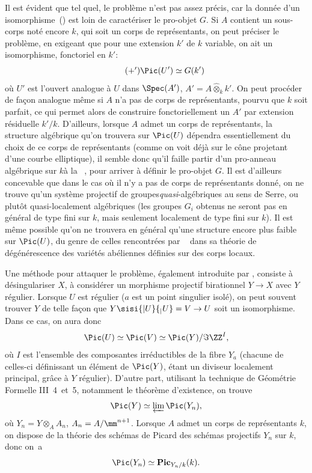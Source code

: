 Il est \'evident que tel quel, le probl\`eme n'est pas assez pr\'ecis, car la donn\'ee d'un isomorphisme~() est loin de caract\'eriser le pro-objet $G$. Si $A$ contient un sous-corps not\'e encore $k$, qui soit un corps de repr\'esentants, on peut pr\'eciser le probl\`eme, en exigeant que pour une extension $k'$ de $k$ variable, on ait un isomorphisme, fonctoriel en $k'$: \begin{equation*} \label{eq:XIII.5.+'} \tag{$+'$} {\Pic(U')\simeq G(k')} \end{equation*} o\`u $U'$ est l'ouvert analogue \`a $U$ dans $\Spec(A')$, $A'=A\hat{\otimes}_k k'$. On peut proc\'eder de fa\c con analogue m\^eme si $A$ n'a pas de corps de repr\'esentants, pourvu que $k$ soit parfait, ce qui permet alors de construire fonctoriellement un $A'$ \og par extension r\'esiduelle $k'/k$\fg. D'ailleurs, lorsque $A$ admet un corps de repr\'esentants, la structure alg\'ebrique qu'on trouvera sur $\Pic(U)$ d\'ependra essentiellement du choix de ce corps de repr\'esentants (comme on voit d\'ej\`a sur le c\^{o}ne projetant d'une courbe elliptique), il semble donc qu'il faille partir d'un \og pro-anneau alg\'ebrique sur $k$\fg \`a la ~\cite{XIII.3}, pour arriver \`a d\'efinir le pro-objet $G$. Il est d'ailleurs concevable que dans le cas o\`u il n'y a pas de corps de repr\'esentants donn\'e, on ne trouve qu'un syst\`eme projectif de groupes\pageoriginaled \emph{quasi}-alg\'ebriques au sens de Serre, ou plut\^{o}t quasi-localement alg\'ebriques (les groupes $G_i$ obtenus ne seront pas en g\'en\'eral de type fini sur $k$, mais seulement localement de type fini sur $k$). Il est m\^eme possible qu'on ne trouvera en g\'en\'eral qu'une structure encore plus faible sur $\Pic(U)$, du genre de celles rencontr\'ees par ~\cite{XIII.6} dans sa th\'eorie de d\'eg\'en\'erescence des vari\'et\'es ab\'eliennes d\'efinies sur des corps locaux.

Une m\'ethode pour attaquer le probl\`eme, \'egalement introduite par , consiste \`a d\'esingulariser $X$, \ie \`a consid\'erer un morphisme projectif birationnel $Y\to X$ avec $Y$ r\'egulier. Lorsque $U$ est r\'egulier (\ie $a$ est un point singulier isol\'e), on peut souvent trouver $Y$ de telle fa\c con que $Y\sisi{|U}{_|U}=V\to U$ soit un isomorphisme. Dans ce cas, on aura donc $$ \Pic(U)\simeq\Pic(V)\simeq\Pic(Y)/\Im \ZZ^I, $$ o\`u $I$ est l'ensemble des composantes irr\'eductibles de la fibre $Y_{a}$\sisi{, }{} (chacune de celles-ci d\'efinissant un \'el\'ement de $\Pic(Y)$, \'etant un diviseur localement principal, gr\^ace \`a $Y$ r\'egulier). D'autre part, utilisant la technique de G\'eom\'etrie Formelle \EGA III~4~et~5, notamment le th\'eor\`eme d'existence, on trouve $$ \Pic(Y)\simeq\varprojlim\Pic(Y_n), $$ o\`u $Y_n=Y\otimes_A A_n$, $A_n=A/\mm^{n+1}$. Lorsque $A$ admet un corps de repr\'esentants $k$, on dispose de la th\'eorie des sch\'emas de Picard des sch\'emas projectifs $Y_n$ sur $k$, donc on~a $$ \Pic(Y_n)\simeq \mathbf{Pic}_{Y_n/k}(k). $$

